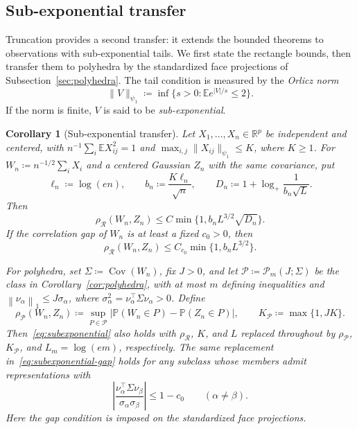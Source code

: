 \documentclass[11pt,letterpaper]{article}
\newtheorem{corollary}{Corollary}
\theoremstyle{remark}
\newcommand{\E}{\mathbb E}
\newcommand{\Pp}{\mathbb P}
\newcommand{\R}{\mathbb R}
\newcommand{\Cov}{\operatorname{Cov}}
\newcommand{\norm}[1]{\left\lVert#1\right\rVert}
\newcommand{\rh}{\rho_{\mathcal R}}
\begin{document}
\subsection{Sub-exponential transfer}\label{sec:subexponential}
Truncation provides a second transfer: it extends the bounded theorems
to observations with sub-exponential tails. We first state the rectangle
bounds, then transfer them to polyhedra by the standardized face
projections of Subsection~\ref{sec:polyhedra}. The tail condition is
measured by the \emph{Orlicz norm}
\[
 \|V\|_{\psi_1}\coloneqq \inf\{s>0:\E e^{|V|/s}\le2\}.
\]
If the norm is finite, \(V\) is said to be \emph{sub-exponential}.

\begin{corollary}[Sub-exponential transfer]\label{cor:subexponential}
Let \(X_1,\ldots,X_n\in\R^p\) be independent and centered, with
\(n^{-1}\sum_i\E X_{ij}^2=1\) and
\(\max_{i,j}\|X_{ij}\|_{\psi_1}\le K\), where \(K\ge1\).
For \(W_n\coloneqq n^{-1/2}\sum_iX_i\) and a centered Gaussian \(Z_n\)
with the same covariance, put
\[
 \ell_n\coloneqq \log(en),\qquad b_n\coloneqq \frac{K\ell_n}{\sqrt n},\qquad
 D_n\coloneqq 1+\log_+\frac1{b_n\sqrt L}.
\]
Then
\begin{equation}
 \rh(W_n,Z_n)\le C\min\{1,b_nL^{3/2}\sqrt{D_n}\}.
 \label{eq:subexponential}
\end{equation}
If the correlation gap of \(W_n\) is at least a fixed \(c_0>0\), then
\begin{equation}
 \rh(W_n,Z_n)\le C_{c_0}\min\{1,b_nL^{3/2}\}.
 \label{eq:subexponential-gap}
\end{equation}

For polyhedra, set \(\Sigma\coloneqq\Cov(W_n)\), fix \(J>0\), and
let \(\mathcal P\coloneqq\mathcal P_m(J;\Sigma)\) be the class in
Corollary~\ref{cor:polyhedra}, with at most \(m\) defining inequalities
and \(\norm{\nu_\alpha}_1\le J\sigma_\alpha\), where
\(\sigma_\alpha^2=\nu_\alpha^\top\Sigma\nu_\alpha>0\). Define
\[
 \rho_{\mathcal P}(W_n,Z_n)\coloneqq
 \sup_{P\in\mathcal P}|\Pp(W_n\in P)-\Pp(Z_n\in P)|,
 \qquad K_{\mathcal P}\coloneqq\max\{1,JK\}.
\]
Then~\eqref{eq:subexponential} also holds with
\(\rh\), \(K\), and \(L\) replaced throughout by
\(\rho_{\mathcal P}\), \(K_{\mathcal P}\), and
\(L_m=\log(em)\), respectively. The same replacement
in~\eqref{eq:subexponential-gap} holds for any subclass whose members
admit representations with
\[
 \left|\frac{\nu_\alpha^\top\Sigma\nu_\beta}
 {\sigma_\alpha\sigma_\beta}\right|\le1-c_0
 \qquad(\alpha\ne\beta).
\]
Here the gap condition is imposed on the standardized face projections.
\end{corollary}
\end{document}
